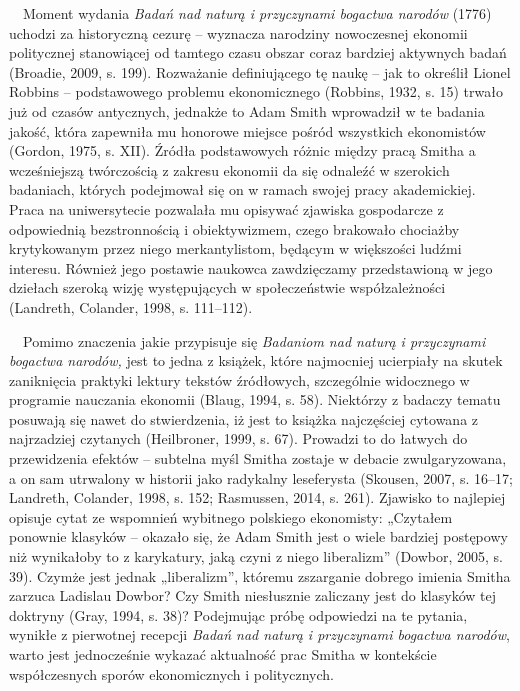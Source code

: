 \documentclass[a4paper]{article}
\newcommand\textstyleFootnoteCharacters[1]{\textsuperscript{#1}}
\begin{document}
\ \ Moment wydania \textit{Badań nad naturą i przyczynami bogactwa narodów} (1776) uchodzi za historyczną cezurę – wyznacza narodziny nowoczesnej ekonomii politycznej stanowiącej od tamtego czasu obszar coraz bardziej aktywnych badań \label{ref:RNDxlNYKcaRLz}(Broadie, 2009, s. 199). Rozważanie definiującego tę naukę – jak to określił Lionel Robbins – podstawowego problemu ekonomicznego \label{ref:RNDnxuF1ebG8p}(Robbins, 1932, s. 15) trwało już od czasów antycznych, jednakże to Adam Smith wprowadził w te badania jakość, która zapewniła mu honorowe miejsce pośród wszystkich ekonomistów \label{ref:RNDXwmhFbTJ5B}(Gordon, 1975, s. XII). Źródła podstawowych różnic między pracą Smitha a wcześniejszą twórczością z zakresu ekonomii da się odnaleźć w szerokich badaniach, których podejmował się on w ramach swojej pracy akademickiej. Praca na uniwersytecie pozwalała mu opisywać zjawiska gospodarcze z odpowiednią bezstronnością i obiektywizmem, czego brakowało chociażby krytykowanym przez niego merkantylistom, będącym w większości ludźmi interesu. Również jego postawie naukowca zawdzięczamy przedstawioną w jego dziełach szeroką wizję występujących w społeczeństwie współzależności \label{ref:RNDQbbqHBuaQg}(Landreth, Colander, 1998, s. 111–112).

 \ \ Pomimo znaczenia jakie przypisuje się \textit{Badaniom nad naturą i przyczynami bogactwa narodów,} jest to jedna z książek, które najmocniej ucierpiały na skutek zaniknięcia praktyki lektury tekstów źródłowych, szczególnie widocznego w programie nauczania ekonomii \label{ref:RNDwb8UrvF6xd}(Blaug, 1994, s. 58). Niektórzy z badaczy tematu posuwają się nawet do stwierdzenia, iż jest to książka najczęściej cytowana z najrzadziej czytanych \label{ref:RNDhU0CYVU7xS}(Heilbroner, 1999, s. 67). Prowadzi to do łatwych do przewidzenia efektów – subtelna myśl Smitha zostaje w debacie zwulgaryzowana, a on sam utrwalony w historii jako radykalny leseferysta \label{ref:RNDllaqGb90E5}(Skousen, 2007, s. 16–17; Landreth, Colander, 1998, s. 152; Rasmussen, 2014, s. 261). Zjawisko to najlepiej opisuje cytat ze wspomnień wybitnego polskiego ekonomisty: „Czytałem ponownie klasyków – okazało się, że Adam Smith jest o wiele bardziej postępowy niż wynikałoby to z karykatury, jaką czyni z niego liberalizm”\textstyleFootnoteCharacters{ }\label{ref:RNDuVHaEp23gh}(Dowbor, 2005, s. 39). Czymże jest jednak „liberalizm”, któremu zszarganie dobrego imienia Smitha zarzuca Ladislau Dowbor? Czy Smith niesłusznie zaliczany jest do klasyków tej doktryny \label{ref:RNDk1CfNtw5Df}(Gray, 1994, s. 38)? Podejmując próbę odpowiedzi na te pytania, wynikłe z pierwotnej recepcji \textit{Badań nad naturą i przyczynami bogactwa narodów}, warto jest jednocześnie wykazać aktualność prac Smitha w kontekście współczesnych sporów ekonomicznych i politycznych.
\end{document}
